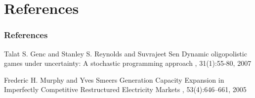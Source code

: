 \documentclass[mathserif,10pt]{beamer}
\begin{document}
\section{References}
\scriptsize

\begin{frame}[allowframebreaks]
      \frametitle<presentation>{References}

      \begin{thebibliography}{8}



    \beamertemplatearticlebibitems

    Talat S. Genc and Stanley S. Reynolds and Suvrajeet Sen
    \newblock Dynamic oligopolistic games under uncertainty: A stochastic programming approach
    , 31(1):55-80, 2007 

    Frederic H. Murphy and Yves Smeers
    \newblock Generation Capacity Expansion in Imperfectly Competitive Restructured Electricity Markets
    , 53(4):646--661, 2005

   \end{thebibliography}
\end{frame}
\end{document}

